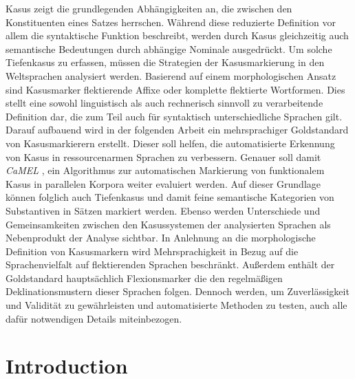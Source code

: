 \documentclass[11pt,a4paper,twoside,openright]{scrbook}
\begin{document}
Kasus zeigt die grundlegenden Abhängigkeiten an, die zwischen den Konstituenten eines Satzes herrschen. Während diese reduzierte Definition vor allem die syntaktische Funktion beschreibt, werden durch Kasus gleichzeitig auch semantische Bedeutungen durch abhängige Nominale ausgedrückt. Um solche Tiefenkasus zu erfassen, müssen die Strategien der Kasusmarkierung in den Weltsprachen analysiert werden. Basierend auf einem morphologischen Ansatz sind Kasusmarker flektierende Affixe oder komplette flektierte Wortformen. Dies stellt eine sowohl linguistisch als auch rechnerisch sinnvoll zu verarbeitende Definition dar, die zum Teil auch für syntaktisch unterschiedliche Sprachen gilt. Darauf aufbauend wird in der folgenden Arbeit ein mehrsprachiger Goldstandard von Kasusmarkierern erstellt. Dieser soll helfen, die automatisierte Erkennung von Kasus in ressourcenarmen Sprachen zu verbessern. Genauer soll damit \textit{CaMEL} \citep{weissweiler2022camel}, ein Algorithmus zur automatischen Markierung von funktionalem Kasus in parallelen Korpora weiter evaluiert werden. Auf dieser Grundlage können folglich auch Tiefenkasus und damit feine semantische Kategorien von Substantiven in Sätzen markiert werden. Ebenso werden Unterschiede und Gemeinsamkeiten zwischen den Kasussystemen der analysierten Sprachen als Nebenprodukt der Analyse sichtbar. In Anlehnung an die morphologische Definition von Kasusmarkern wird Mehrsprachigkeit in Bezug auf die Sprachenvielfalt auf flektierenden Sprachen beschränkt. Außerdem enthält der Goldstandard hauptsächlich Flexionsmarker die den regelmäßigen Deklinationsmustern dieser Sprachen folgen. Dennoch werden, um Zuverlässigkeit und Validität zu gewährleisten und automatisierte Methoden zu testen, auch alle dafür notwendigen Details miteinbezogen. 





\tableofcontents


\chapter{Introduction}
\end{document}

